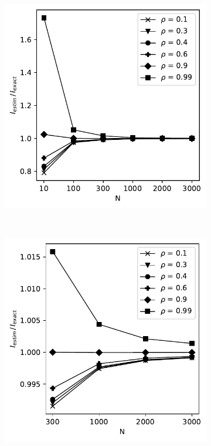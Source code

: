 \documentclass[../Thesis.tex]{subfiles}
\begin{document}
\begin{figure}[h]
    \centering
    \begin{subfigure}[t]{0.49\textwidth}
        \centering
        \includegraphics[width=\linewidth]{figures/ND examples/MI calc/gaussian example all.pdf}
        \caption{}
        \label{subfig:new MI method all}
    \end{subfigure}%
    ~
    \begin{subfigure}[t]{0.49\textwidth}
        \centering
        \includegraphics[width=\linewidth]{figures/ND examples/MI calc/gaussian example zoom.pdf}

\end{subfigure}
\end{figure}
\end{document}

